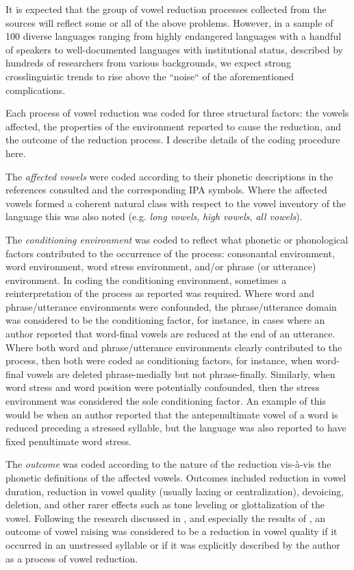   It is expected that the group of vowel reduction processes collected from the sources will reflect some or all of the above problems. However, in a sample of 100 diverse languages ranging from highly endangered languages with a handful of speakers to well-documented languages with institutional status, described by hundreds of researchers from various backgrounds, we expect strong crosslinguistic trends to rise above the “noise“ of the aforementioned complications.

  Each process of vowel reduction was coded for three structural factors: the vowels affected, the properties of the environment reported to cause the reduction, and the outcome of the reduction process. I describe details of the coding procedure here.

  The \textit{affected vowels} were coded according to their phonetic descriptions in the references consulted and the corresponding IPA symbols. Where the affected vowels formed a coherent natural class with respect to the vowel inventory of the language this was also noted (e.g. \textit{long vowels}, \textit{high vowels}, \textit{all vowels}).

  The \textit{conditioning environment} was coded to reflect what phonetic or phonological factors contributed to the occurrence of the process: consonantal environment, word environment, word stress environment, and/or phrase (or utterance) environment. In coding the conditioning environment, sometimes a reinterpretation of the process as reported was required. Where word and phrase/utterance environments were confounded, the phrase/utterance domain was considered to be the conditioning factor, for instance, in cases where an author reported that word-final vowels are reduced at the end of an utterance. Where both word and phrase/utterance environments clearly contributed to the process, then both were coded as conditioning factors, for instance, when word-final vowels are deleted phrase-medially but not phrase-finally. Similarly, when word stress and word position were potentially confounded, then the stress environment was considered the sole conditioning factor. An example of this would be when an author reported that the antepenultimate vowel of a word is reduced preceding a stressed syllable, but the language was also reported to have fixed penultimate word stress.

  The \textit{outcome} was coded according to the nature of the reduction vis-à-vis the phonetic definitions of the affected vowels. Outcomes included reduction in vowel duration, reduction in vowel quality (usually laxing or centralization), devoicing, deletion, and other rarer effects such as tone leveling or glottalization of the vowel. Following the research discussed in , and especially the results of \citet{KapatsinskiEtAl2019}, an outcome of vowel raising was considered to be a reduction in vowel quality if it occurred in an unstressed syllable or if it was explicitly described by the author as a process of vowel reduction.

